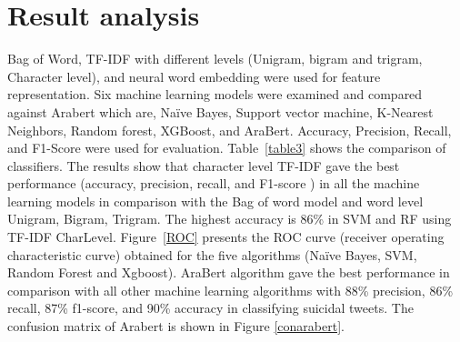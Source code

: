 \documentclass[11pt]{article}
\begin{document}

\section{Result analysis}
Bag of Word, TF-IDF with different levels (Unigram, bigram and trigram, Character level), and neural word embedding were used for feature representation. %
Six machine learning models were examined and compared against Arabert which are, Naïve Bayes, Support vector machine, K-Nearest Neighbors, Random forest, XGBoost, and AraBert. Accuracy, Precision, Recall, and F1-Score were used for evaluation. Table~\ref{table3} shows the comparison of classifiers. The results show that character level TF-IDF gave the best performance (accuracy, precision, recall, and F1-score ) in all the machine learning models in comparison with the Bag of word model and word level Unigram, Bigram, Trigram. The highest accuracy is 86\% in SVM and RF using TF-IDF CharLevel. Figure~\ref{ROC} presents the ROC curve (receiver operating characteristic curve) obtained for the five algorithms (Naïve Bayes, SVM, Random Forest and Xgboost). 
%
AraBert algorithm gave the best performance in comparison with all other machine learning algorithms with 88\% precision, 86\% recall, 87\% f1-score, and 90\% accuracy in classifying suicidal tweets. The confusion matrix of Arabert is shown in Figure \ref{conarabert}.
\end{document}
